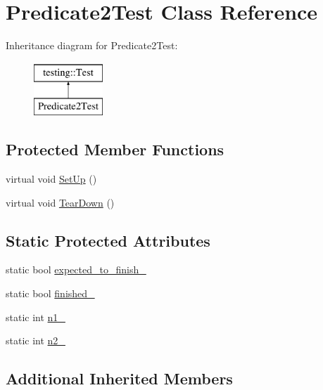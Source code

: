 \hypertarget{class_predicate2_test}{\section{Predicate2\-Test Class Reference}
\label{class_predicate2_test}
}
Inheritance diagram for Predicate2\-Test\-:\begin{figure}[H]
\begin{center}
\leavevmode
\includegraphics[height=2.000000cm]{class_predicate2_test}
\end{center}
\end{figure}
\subsection*{Protected Member Functions}
\begin{DoxyCompactItemize}
\item 
virtual void \hyperlink{class_predicate2_test_a9778563daf4846327d32061c1a8ccba0}{Set\-Up} ()
\item 
virtual void \hyperlink{class_predicate2_test_a7379f8f7772af6b4c76edcc90b6aaaeb}{Tear\-Down} ()
\end{DoxyCompactItemize}
\subsection*{Static Protected Attributes}
\begin{DoxyCompactItemize}
\item 
static bool \hyperlink{class_predicate2_test_a56cf1f0f556addd9a62e0644dc1a86fc}{expected\-\_\-to\-\_\-finish\-\_\-}
\item 
static bool \hyperlink{class_predicate2_test_a30f4ef76d3004253078e767e5c653b85}{finished\-\_\-}
\item 
static int \hyperlink{class_predicate2_test_ac002d8e279b24e75906fd19973fc2170}{n1\-\_\-}
\item 
static int \hyperlink{class_predicate2_test_a9dbe5173570b9b911af2df889c287027}{n2\-\_\-}
\end{DoxyCompactItemize}
\subsection*{Additional Inherited Members}


